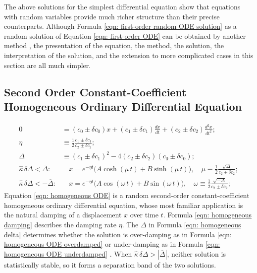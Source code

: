 \documentclass[twoside]{article}
\numberwithin{equation}{section}
\begin{document}
The above solutions for the simplest differential equation show that equations with random variables provide much richer structure than their precise counterparts.
Although Formula \eqref{eqn: first-order random ODE solution} as a random solution of Equation \eqref{eqn: first-order ODE} can be obtained by another method \cite{Random_Differential_Equations}, the presentation of the equation, the method, the solution, the interpretation of the solution, and the extension to more complicated cases in this section are all much simpler.


\subsection{Second Order Constant-Coefficient Homogeneous Ordinary Differential Equation}

\begin{align}
\label{eqn: homogeneous ODE}
0 &= (c_0 \pm \delta c_0) x + (c_1 \pm \delta c_1) \frac{d x}{d t} + (c_2 \pm \delta c_2) \frac{d^2 x}{d t^2}; \\
\label{eqn: homogeneous damping}
\eta &\equiv \frac{1}{2} \frac{c_1 \pm \delta c_1}{c_2 \pm \delta c_2}; \\
\label{eqn: homogeneous delta}
\Delta &\equiv (c_1 \pm \delta c_1)^2 - 4 (c_2 \pm \delta c_2)(c_0 \pm \delta c_0); \\
\label{eqn: homogeneous ODE overdamped}
\hat{\kappa}\, \delta \Delta < \overline{\Delta}:&\quad
	x= e^{-\eta t} \big(A \cosh(\mu\, t) + B \sinh(\mu\, t)\big), \quad
		\mu \equiv \frac{1}{2} \frac{\sqrt{\Delta}}{c_2 \pm \delta c_2}; \\
\label{eqn: homogeneous ODE underdamped}
\hat{\kappa}\, \delta \Delta < - \overline{\Delta}:&\quad
	x = e^{-\eta t} \big(A \cos(\omega\, t) + B \sin(\omega\, t)\big), \quad
		\omega \equiv \frac{1}{2} \frac{\sqrt{-\Delta}}{c_2 \pm \delta c_2};
\end{align}
Equation \eqref{eqn: homogeneous ODE} is a random second-order constant-coefficient homogeneous ordinary differential equation, whose most familiar application is the natural damping of a displacement $x$ over time $t$.
Formula \eqref{eqn: homogeneous damping} describes the damping rate $\eta$.
The $\Delta$ in Formula \eqref{eqn: homogeneous delta} determines whether the solution is over-damping as in Formula \eqref{eqn: homogeneous ODE overdamped} or under-damping as in Formula \eqref{eqn: homogeneous ODE underdamped} \cite{Numerical_Recipes}.
When $\hat{\kappa}\, \delta \Delta > |\overline{\Delta}|$, neither solution is statistically stable, so it forms a separation band of the two solutions.
\end{document}
